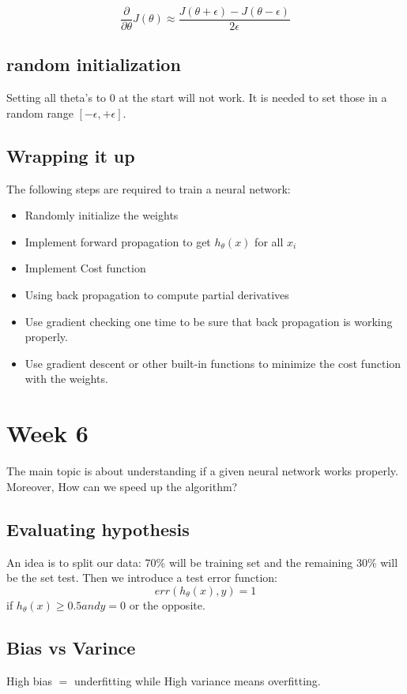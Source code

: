 \documentclass{article}
\begin{document}
$$\frac{\partial}{\partial \theta}J(\theta) \approx \frac{J(\theta + \epsilon)
- J(\theta - \epsilon)}{2\epsilon} $$

\subsection{random initialization}
Setting all theta's to 0 at the start will not work. It is needed to set those
in a random range $[-\epsilon,+\epsilon]$.
\subsection{Wrapping it up}
The following steps are required to train a neural network:
\begin{itemize}
  \item Randomly initialize the weights
  \item Implement forward propagation to get $h_\theta(x)$ for all $x_i$
  \item Implement Cost function
  \item Using back propagation to compute partial derivatives
  \item Use gradient checking one time to be sure that back propagation
        is working properly.
  \item Use gradient descent or other built-in functions to minimize the cost
        function with the weights.


\end{itemize}

\section{Week 6}
The main topic is about understanding if a given neural network works properly.
Moreover, How can we speed up the algorithm?

\subsection{Evaluating hypothesis}
An idea is to split our data: 70\% will be training set and the remaining 30\%
will be the set test. Then we introduce a test error function:
$$err(h_\theta(x),y) = 1 $$ if $h_\theta(x) \geq 0.5 and  y = 0$ or the opposite.

\subsection{Bias vs Varince}
High bias $=$ underfitting while High variance means overfitting. \\
\end{document}
